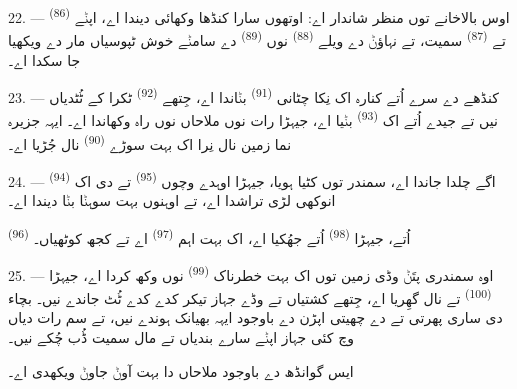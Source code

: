 22. --- اوس بالاخانے توں منظر شاندار اے: اوتھوں سارا کنڈھا وکھائی دیندا اے، اپݨے
 \textsuperscript{(86)} تے 
\textsuperscript{(87)} سمیت، تے نہاؤݨ دے ویلے 
\textsuperscript{(88)} نوں  \textsuperscript{(89)} دے سامݨے خوش ٹپوسیاں
مار دے ویکھیا جا سکدا اے۔

23. --- کنڈھے دے سرے اُتے کنارہ اک نِکا چٹانی 
\textsuperscript{(91)} بݨاندا اے، جِتھے  \textsuperscript{(92)} ٹکرا کے
ٹُٹدیاں نیں تے جیدے اُتے اک  \textsuperscript{(93)} بݨیا اے،
جیہڑا رات نوں ملاحاں نوں راہ وکھاندا اے۔ ایہہ جزیرہ نما زمین نال نِرا اک بہت
سوڑے  \textsuperscript{(90)} نال جُڑیا اے۔

\VUsaut{3.0mm}
\VUsaut{3.0mm}

24. ---  \textsuperscript{(94)} اگے چلدا جاندا اے، سمندر توں کٹیا ہویا،
جیہڑا اوہدے وچوں  \textsuperscript{(95)} تے  دی اک
انوکھی لڑی تراشدا اے، تے اوہنوں بہت سوہݨا بݨا دیندا اے۔

 \textsuperscript{(96)} اُتے، جیہڑا 
\textsuperscript{(98)} اُتے جھُکیا اے، اک بہت اہم  \textsuperscript{(97)}
اے تے کجھ کوٹھیاں۔

25. --- اوہ سمندری پتَݨ وڈی زمین توں اک بہت خطرناک 
\textsuperscript{(99)} نوں وکھ کردا اے، جیہڑا  \textsuperscript{(100)}
تے  نال گھِریا اے، جِتھے کشتیاں تے وڈے جہاز تیکر کدے کدے ٹُٹ جاندے
نیں۔ بچاء دی ساری پھرتی تے  دے چھیتی اپڑن دے باوجود ایہہ
 بھیانک ہوندے نیں، تے سم رات دیاں  وچ کئی جہاز
اپݨے سارے بندیاں تے مال سمیت ڈُب چُکے نیں۔

ایس گوانڈھ دے باوجود  ملاحاں دا بہت آوݨ جاوݨ ویکھدی اے۔
\VUsaut{6.0mm}
\VUfilet{22mm}
